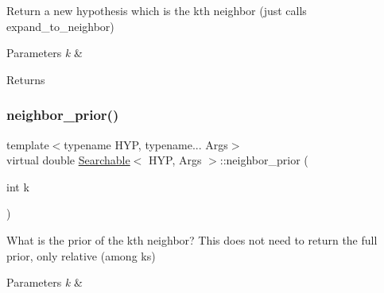 Return a new hypothesis which is the k\textquotesingle{}th neighbor (just calls expand\+\_\+to\+\_\+neighbor) 


\begin{DoxyParams}{Parameters}
{\em k} & \\
\hline
\end{DoxyParams}
\begin{DoxyReturn}{Returns}

\end{DoxyReturn}
\mbox{\label{class_searchable_abebbaaf94b0502a35d0ba686af73bd08}} 
\subsubsection{\texorpdfstring{neighbor\+\_\+prior()}{neighbor\_prior()}}
{\footnotesize\ttfamily template$<$typename H\+YP, typename... Args$>$ \\
virtual double \hyperlink{class_searchable}{Searchable}$<$ H\+YP, Args $>$\+::neighbor\+\_\+prior (\begin{DoxyParamCaption}\item[{int}]{k }\end{DoxyParamCaption})\hspace{0.3cm}{\ttfamily [pure virtual]}}



What is the prior of the k\textquotesingle{}th neighbor? This does not need to return the full prior, only relative (among ks) 


\begin{DoxyParams}{Parameters}
{\em k} & \\
\hline
\end{DoxyParams}


